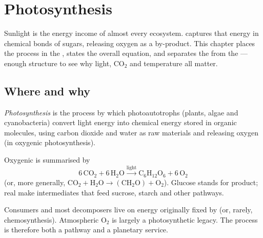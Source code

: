 \chapter{Photosynthesis}\label{ch:g10:photosynthesis}

Sunlight is the energy income of almost every ecosystem. 
captures that energy in chemical bonds of sugars, releasing oxygen as a
by-product. This chapter places the process in the , states
the overall equation, and separates the  from
the  --- enough structure to see why light, $\mathrm{CO_2}$
and temperature all matter.

\section{Where and why}

\begin{definition}[Photosynthesis]\label{def:g10:photosynthesis:def}
\emph{Photosynthesis} is the process by which
photoautotrophs (plants, algae and cyanobacteria) convert light energy
into chemical energy stored in organic molecules, using carbon dioxide
and water as raw materials and releasing oxygen (in oxygenic
photosynthesis).
\end{definition}

\begin{proposition}\label{prop:g10:photosynthesis:equation}
Oxygenic  is summarised by
\[
6\,\mathrm{CO_2} + 6\,\mathrm{H_2O}
\xrightarrow{\text{light}}
\mathrm{C_6H_{12}O_6} + 6\,\mathrm{O_2}
\]
(or, more generally, $\mathrm{CO_2} + \mathrm{H_2O} \to
(\mathrm{CH_2O}) + \mathrm{O_2}$). Glucose stands for 
product; real  make intermediates that feed sucrose, starch and
other pathways.
\end{proposition}
\admitted

\begin{remark}\label{rem:g10:photosynthesis:who}
Consumers and most decomposers live on energy originally fixed by
 (or, rarely, chemosynthesis). Atmospheric $\mathrm{O_2}$
is largely a photosynthetic legacy. The process is therefore both a 
pathway and a planetary service.
\end{remark}

